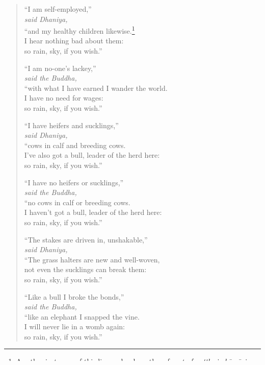 \documentclass[12pt,openany]{book}%
\newcommand*{\scspeaker}[1]{\hspace{2em}\textit{#1}}
\begin{document}
\begin{verse}
“I am self-employed,” \\
\scspeaker{said Dhaniya, }\\
“and my healthy children likewise.\footnote{As other instances of this line make clear, the referent of \textit{yattha} is \textit{\textsanskrit{kāmā}}, i.e. the pleasures of the senses, not the desire and greed (of the previous line). Bodhi gets this nuance right, Norman does not. } \\
I hear nothing bad about them: \\
so rain, sky, if you wish.” 

“I am no-one’s lackey,” \\
\scspeaker{said the Buddha, }\\
“with what I have earned I wander the world. \\
I have no need for wages: \\
so rain, sky, if you wish.” 

“I have heifers and sucklings,” \\
\scspeaker{said Dhaniya, }\\
“cows in calf and breeding cows. \\
I’ve also got a bull, leader of the herd here: \\
so rain, sky, if you wish.” 

“I have no heifers or sucklings,” \\
\scspeaker{said the Buddha, }\\
“no cows in calf or breeding cows. \\
I haven’t got a bull, leader of the herd here: \\
so rain, sky, if you wish.” 

“The stakes are driven in, unshakable,” \\
\scspeaker{said Dhaniya, }\\
“The grass halters are new and well-woven, \\
not even the sucklings can break them: \\
so rain, sky, if you wish.” 

“Like a bull I broke the bonds,” \\
\scspeaker{said the Buddha, }\\
“like an elephant I snapped the vine. \\
I will never lie in a womb again: \\
so rain, sky, if you wish.” 


\end{verse}
\end{document}
